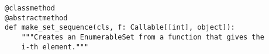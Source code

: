 \par\begin{minipage}{62ex}
\begin{verbatim}
@classmethod
@abstractmethod
def make_set_sequence(cls, f: Callable[[int], object]):
    """Creates an EnumerableSet from a function that gives the
    i-th element."""
\end{verbatim}
\end{minipage}\par